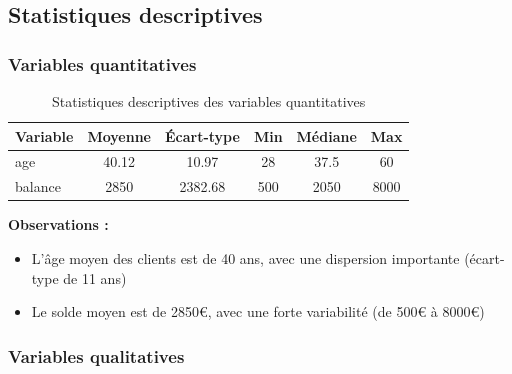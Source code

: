 \documentclass[12pt,a4paper]{article}
\begin{document}
\subsection{Statistiques descriptives}

\subsubsection{Variables quantitatives}

\begin{table}[H]
\centering
\caption{Statistiques descriptives des variables quantitatives}
\begin{tabular}{|l|c|c|c|c|c|}
\hline
\textbf{Variable} & \textbf{Moyenne} & \textbf{Écart-type} & \textbf{Min} & \textbf{Médiane} & \textbf{Max} \\
\hline
age & 40.12 & 10.97 & 28 & 37.5 & 60 \\
balance & 2850 & 2382.68 & 500 & 2050 & 8000 \\
\hline
\end{tabular}
\end{table}

\textbf{Observations :}
\begin{itemize}
    \item L'âge moyen des clients est de 40 ans, avec une dispersion importante (écart-type de 11 ans)
    \item Le solde moyen est de 2850€, avec une forte variabilité (de 500€ à 8000€)
\end{itemize}

\subsubsection{Variables qualitatives}
\end{document}
